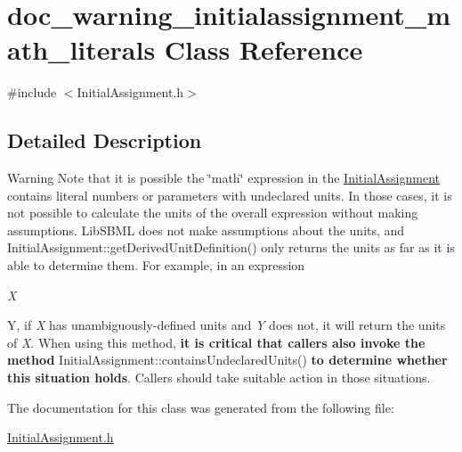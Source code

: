 \hypertarget{classdoc__warning__initialassignment__math__literals}{}\section{doc\+\_\+warning\+\_\+initialassignment\+\_\+math\+\_\+literals Class Reference}
\label{classdoc__warning__initialassignment__math__literals}


{\ttfamily \#include $<$Initial\+Assignment.\+h$>$}



\subsection{Detailed Description}
\begin{DoxyWarning}{Warning}
Note that it is possible the \char`\"{}math\char`\"{} expression in the \hyperlink{class_initial_assignment}{Initial\+Assignment} contains literal numbers or parameters with undeclared units. In those cases, it is not possible to calculate the units of the overall expression without making assumptions. Lib\+S\+B\+ML does not make assumptions about the units, and Initial\+Assignment\+::get\+Derived\+Unit\+Definition() only returns the units as far as it is able to determine them. For example, in an expression {\itshape X
\begin{DoxyItemize}
\item Y, if {\itshape X} has unambiguously-\/defined units and {\itshape Y} does not, it will return the units of {\itshape X}. When using this method, {\bfseries it is critical that callers also invoke the method} Initial\+Assignment\+::contains\+Undeclared\+Units() {\bfseries to determine whether this situation holds}. Callers should take suitable action in those situations. 
\end{DoxyItemize}}
\end{DoxyWarning}


The documentation for this class was generated from the following file\+:\begin{DoxyCompactItemize}
\item 
\hyperlink{_initial_assignment_8h}{Initial\+Assignment.\+h}\end{DoxyCompactItemize}
